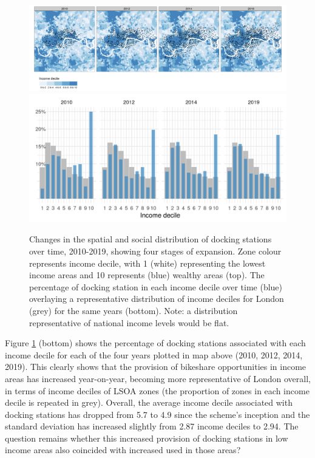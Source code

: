 \documentclass[]{article}
\begin{document}
\begin{figure}

\includegraphics[width=1\linewidth]{figures/facet-imd} \includegraphics[width=1\linewidth]{figures/stations-imd-facet-4-grey} \hfill{}

\caption{Changes in the spatial and social distribution of docking stations over time, 2010-2019, showing four stages of expansion. Zone colour represents income decile, with 1 (white) representing the lowest income areas and 10 represents (blue) wealthy areas (top). The percentage of docking station in each income decile over time (blue) overlaying a representative distribution of income deciles for London (grey) for the same years (bottom). Note: a distribution representative of national income levels would be flat.}\label{fig:facet-map}
\end{figure}

Figure \ref{fig:facet-map} (bottom) shows the percentage of docking stations associated with each income decile for each of the four years plotted in map above (2010, 2012, 2014, 2019).
This clearly shows that the provision of bikeshare opportunities in income areas has increased year-on-year, becoming more representative of London overall, in terms of income deciles of LSOA zones (the proportion of zones in each income decile is repeated in grey).
Overall, the average income decile associated with docking stations has dropped from 5.7 to 4.9 since the scheme's inception and the standard deviation has increased slightly from 2.87 income deciles to 2.94.
The question remains whether this increased provision of docking stations in low income areas also coincided with increased used in those areas?
\end{document}
